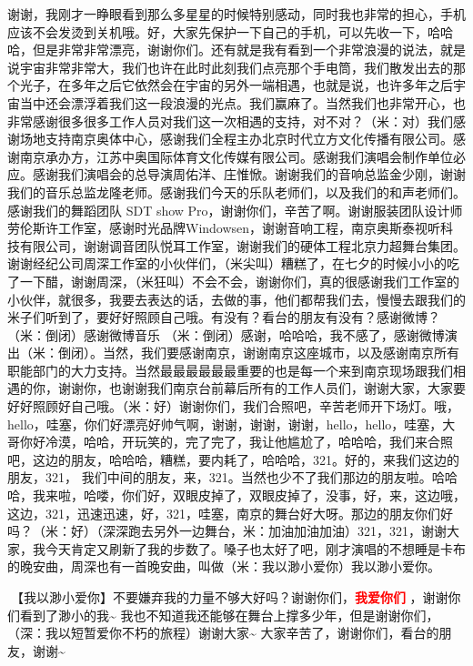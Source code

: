 \documentclass[
]{book}
\begin{document}
谢谢，我刚才一睁眼看到那么多星星的时候特别感动，同时我也非常的担心，手机应该不会发烫到关机哦。好，大家先保护一下自己的手机，可以先收一下，哈哈哈，但是非常非常漂亮，谢谢你们。还有就是我有看到一个非常浪漫的说法，就是说宇宙非常非常大，我们也许在此时此刻我们点亮那个手电筒，我们散发出去的那个光子，在多年之后它依然会在宇宙的另外一端相遇，也就是说，也许多年之后宇宙当中还会漂浮着我们这一段浪漫的光点。我们赢麻了。当然我们也非常开心，也非常感谢很多很多工作人员对我们这一次相遇的支持，对不对？（米：对）我们感谢场地支持南京奥体中心，感谢我们全程主办北京时代立方文化传播有限公司。感谢南京承办方，江苏中奥国际体育文化传媒有限公司。感谢我们演唱会制作单位必应。感谢我们演唱会的总导演周佑洋、庄惟惞。谢谢我们的音响总监金少刚，谢谢我们的音乐总监龙隆老师。感谢我们今天的乐队老师们，以及我们的和声老师们。感谢我们的舞蹈团队 SDT show Pro，谢谢你们，辛苦了啊。谢谢服装团队设计师劳伦斯许工作室，感谢时光品牌Windowsen，谢谢音响工程，南京奥斯泰视听科技有限公司，谢谢调音团队悦耳工作室，谢谢我们的硬体工程北京力超舞台集团。谢谢经纪公司周深工作室的小伙伴们，（米尖叫）糟糕了，在七夕的时候小小的吃了一下醋，谢谢周深，（米狂叫）不会不会，谢谢你们，真的很感谢我们工作室的小伙伴，就很多，我要去表达的话，去做的事，他们都帮我们去，慢慢去跟我们的米子们听到了，要好好照顾自己哦。有没有？看台的朋友有没有？感谢微博？（米：倒闭）感谢微博音乐 （米：倒闭）感谢，哈哈哈，我不感了，感谢微博演出（米：倒闭）。当然，我们要感谢南京，谢谢南京这座城市，以及感谢南京所有职能部门的大力支持。当然最最最最最最重要的也是每一个来到南京现场跟我们相遇的你，谢谢你，也谢谢我们南京台前幕后所有的工作人员们，谢谢大家，大家要好好照顾好自己哦。（米：好）谢谢你们，我们合照吧，辛苦老师开下场灯。哦，hello，哇塞，你们好漂亮好帅气啊，谢谢，谢谢，谢谢，hello，hello，哇塞，大哥你好冷漠，哈哈，开玩笑的，完了完了，我让他尴尬了，哈哈哈，我们来合照吧，这边的朋友，哈哈哈，糟糕，要内耗了，哈哈哈，321。好的，来我们这边的朋友，321， 我们中间的朋友，来，321。当然也少不了我们那边的朋友啦。哈哈哈，我来啦，哈喽，你们好，双眼皮掉了，双眼皮掉了，没事，好，来，这边哦，这边，321，迅速迅速，好，321，哇塞，南京的舞台好大呀。那边的朋友你们好吗？（米：好）（深深跑去另外一边舞台，米：加油加油加油）321，321，谢谢大家，我今天肯定又刷新了我的步数了。嗓子也太好了吧，刚才演唱的不想睡是卡布的晚安曲，周深也有一首晚安曲，叫做（米：我以渺小爱你）我以渺小爱你。

🎵【我以渺小爱你】不要嫌弃我的力量不够大好吗？谢谢你们，\textbf{\textcolor{red}{我爱你们} }，谢谢你们看到了渺小的我\textasciitilde{} 我也不知道我还能够在舞台上撑多少年，但是谢谢你们，（深：我以短暂爱你不朽的旅程）谢谢大家\textasciitilde{} 大家辛苦了，谢谢你们，看台的朋友，谢谢\textasciitilde{}
\end{document}
